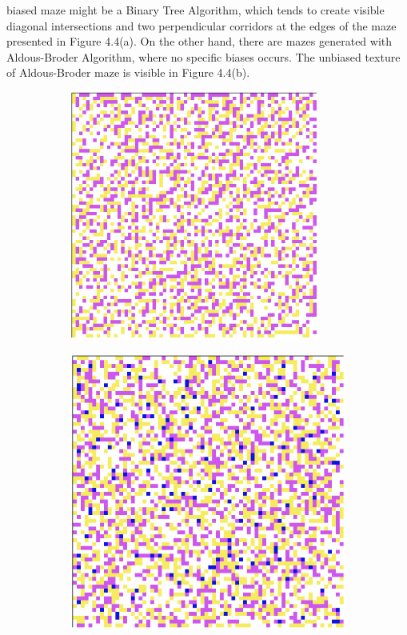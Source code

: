 biased maze might be a Binary Tree Algorithm, which tends to create visible diagonal intersections and two perpendicular corridors
at the edges of the maze presented in Figure 4.4(a). On the other hand, there are mazes generated with Aldous-Broder Algorithm, where no specific biases
occurs. The unbiased texture of Aldous-Broder maze is visible in Figure 4.4(b).
\newline
\begin{figure}[!h]
    \centering
    \begin{subfigure}{.4\textwidth}
    \centering
    \includegraphics[width=0.9\textwidth]{binarydegree.png}
    \caption{}
    \end{subfigure}%
    \begin{subfigure}{0.4\textwidth}
    \centering
    \includegraphics[width=0.9\linewidth]{aldousdegree.png}

\end{subfigure}
\end{figure}
